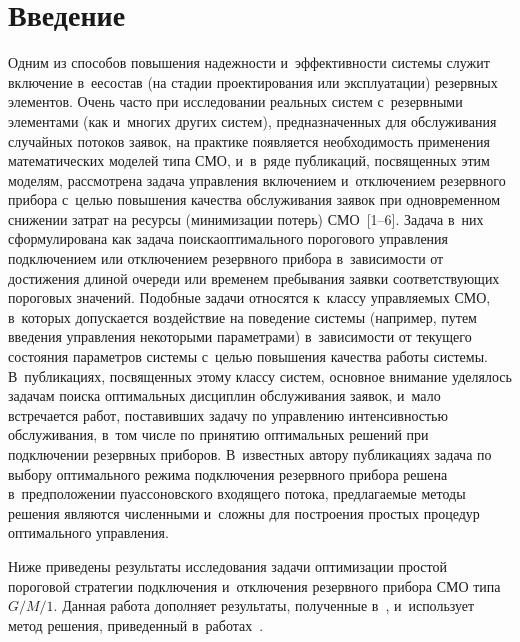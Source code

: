 \begin{multicols}{2}

\label{st\stat}

\section{Введение}

  Одним из способов повышения надежности и~эффективности сис\-те\-мы 
служит включение в~ее\linebreak состав (на стадии проектирования или эксплуатации) 
резервных элементов. Очень часто при исследовании реальных сис\-тем 
с~резервными элементами (как и~многих других сис\-тем), \mbox{предназначенных} для 
обслуживания случайных потоков заявок, на практике появляется 
необходимость применения математических моделей типа 
СМО, и~в~ряде пуб\-ли\-ка\-ций, посвященных этим моделям, 
рассмотрена задача управ\-ле\-ния включением и~отключением резервного 
прибора с~целью повышения качества обслуживания заявок при 
одновременном снижении затрат на ресурсы (минимизации потерь)  
СМО~[1--6]. Задача в~них сформулирована как задача поиска\linebreak оптимального 
порогового управления подключением или отключением резервного прибора 
в~зависимости от достижения длиной очереди или временем пребывания 
заявки соответствующих \mbox{пороговых} значений. Подобные задачи относятся\linebreak 
к~классу управ\-ля\-емых СМО, в~которых допускается 
воздействие на поведение сис\-те\-мы (например, путем введения управ\-ле\-ния 
некоторыми па\-ра\-мет\-ра\-ми) в~за\-ви\-си\-мости от текущего со\-сто\-яния параметров 
сис\-те\-мы с~\mbox{целью} повышения качества работы сис\-те\-мы. В~пуб\-ли\-ка\-ци\-ях, 
посвященных этому классу сис\-тем, основное внимание уделялось задачам 
поиска оптимальных дисциплин обслуживания заявок, и~мало встречается 
работ, по\-ста\-вив\-ших задачу по управ\-ле\-нию ин\-тен\-сив\-ностью обслуживания, 
в~том числе по принятию оптимальных решений при подключении резервных 
приборов. В~известных автору пуб\-ли\-ка\-ци\-ях задача по выбору оптимального 
режима подключения резервного прибора решена в~предположении 
пуассоновского входящего потока, пред\-ла\-га\-емые методы решения являются 
численными и~сложны для построения простых процедур оптимального  
управ\-ле\-ния. 
  
  Ниже приведены результаты исследования задачи оптимизации простой 
пороговой стратегии подключения и~отключения резервного прибора СМО 
типа $G/M/1$. Данная работа дополняет результаты, полученные в~\cite{6-aga}, 
и~использует метод решения, приведенный в~работах~\cite{7-aga, 8-aga}.


\end{multicols}
